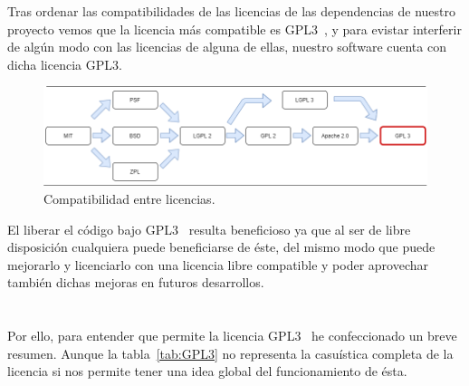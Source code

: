 Tras ordenar las compatibilidades de las licencias de las dependencias de nuestro proyecto vemos que la licencia más compatible es GPL3~\cite{lic:GPL3}, y para evistar interferir de algún modo con las licencias de alguna de ellas, nuestro software cuenta con dicha licencia GPL3.
\begin{figure}[h!]
    \centering
    \includegraphics[width=\textwidth]{img/Diagramas/LicenseComp.png}
    \caption{Compatibilidad entre licencias. } \label{LicenseComp}
\end{figure}

El liberar el código bajo GPL3~\cite{lic:GPL3} resulta beneficioso ya que al ser de libre disposición cualquiera puede beneficiarse de éste, del mismo modo que puede mejorarlo y licenciarlo con una licencia libre compatible y poder aprovechar también dichas mejoras en futuros desarrollos. \\\\\\


Por ello, para entender que permite la licencia GPL3~\cite{lic:GPL3} he confeccionado un breve resumen. Aunque la tabla~\ref{tab:GPL3} no representa la casuística completa de la licencia si nos permite tener una idea global del funcionamiento de ésta.

